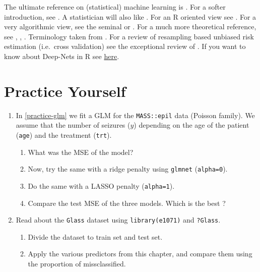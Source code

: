 \documentclass[]{book}
\providecommand{\tightlist}{%
  \setlength{\itemsep}{0pt}\setlength{\parskip}{0pt}}
\theoremstyle{definition}
\theoremstyle{definition}
\theoremstyle{definition}
\theoremstyle{remark}
\begin{document}
The ultimate reference on (statistical) machine learning is
\citet{friedman2001elements}. For a softer introduction, see
\citet{james2013introduction}. A statistician will also like
\citet{ripley2007pattern}. For an R oriented view see
\citet{lantz2013machine}. For a very algorithmic view, see the seminal
\citet{leskovec2014mining} or \citet{conway2012machine}. For a much more
theoretical reference, see \citet{mohri2012foundations},
\citet{vapnik2013nature}, \citet{shalev2014understanding}. Terminology
taken from \citet{sammut2011encyclopedia}. For a review of resampling
based unbiased risk estimation (i.e.~cross validation) see the
exceptional review of \citet{arlot2010survey}. If you want to know about
Deep-Nets in R see
\href{https://www.datacamp.com/community/tutorials/keras-r-deep-learning}{here}.

\section{Practice Yourself}\label{practice-yourself-6}

\begin{enumerate}
\def\labelenumi{\arabic{enumi}.}
\tightlist
\item
  In \ref{practice-glm} we fit a GLM for the \texttt{MASS::epil} data
  (Poisson family). We assume that the number of seizures (\(y\))
  depending on the age of the patient (\texttt{age}) and the treatment
  (\texttt{trt}).

  \begin{enumerate}
  \def\labelenumii{\arabic{enumii}.}
  \tightlist
  \item
    What was the MSE of the model?
  \item
    Now, try the same with a ridge penalty using \texttt{glmnet}
    (\texttt{alpha=0}).
  \item
    Do the same with a LASSO penalty (\texttt{alpha=1}).
  \item
    Compare the test MSE of the three models. Which is the best ?
  \end{enumerate}
\item
  Read about the \texttt{Glass} dataset using \texttt{library(e1071)}
  and \texttt{?Glass}.

  \begin{enumerate}
  \def\labelenumii{\arabic{enumii}.}
  \tightlist
  \item
    Divide the dataset to train set and test set.
  \item
    Apply the various predictors from this chapter, and compare them
    using the proportion of missclassified.
  \end{enumerate}
\end{enumerate}
\end{document}

